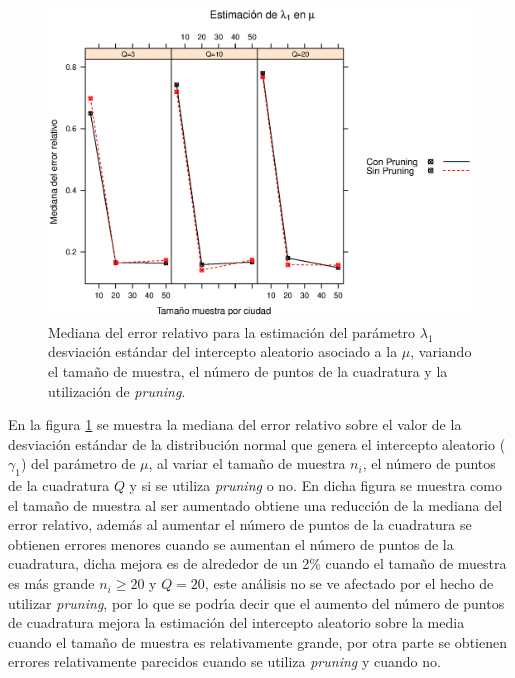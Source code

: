 \begin{figure}
	\begin{center}
		\includegraphics[scale=0.6]{MAPE_lambda1_mu.eps}	
		\caption{Mediana del error relativo para la estimaci\'{o}n del par\'{a}metro $\lambda_1$ desviaci\'{o}n est\'{a}ndar del intercepto aleatorio asociado a la $\mu$, variando el tama\~{n}o de muestra, el n\'{u}mero de puntos de la cuadratura y la utilizaci\'{o}n de \textit{pruning}.}
		\label{MAPE_lambda1_mu}
	\end{center}
\end{figure}

En la figura \ref{MAPE_lambda1_mu} se muestra la mediana del error relativo sobre el valor de la desviaci\'{o}n est\'{a}ndar de la distribuci\'{o}n normal que genera el intercepto aleatorio ($\gamma_1$) del par\'{a}metro de $\mu$, al variar el tama\~{n}o de muestra $n_i$, el n\'{u}mero de puntos de la cuadratura $Q$ y si se utiliza \textit{pruning} o no. En dicha figura se muestra como el tama\~{n}o de muestra al ser aumentado obtiene una reducci\'{o}n de la mediana del error relativo, adem\'{a}s al aumentar el n\'{u}mero de puntos de la cuadratura se obtienen errores menores cuando se aumentan el n\'{u}mero de puntos de la cuadratura, dicha mejora es de alrededor de un 2\% cuando el tama\~{n}o de muestra es m\'{a}s grande $n_i\geq20$ y $Q=20$, este an\'{a}lisis no se ve afectado por el hecho de utilizar \textit{pruning}, por lo que se podr\'{\i}a decir que el aumento del n\'{u}mero de puntos de cuadratura mejora la estimaci\'{o}n del intercepto aleatorio sobre la media cuando el tama\~{n}o de muestra es relativamente grande, por otra parte se obtienen errores relativamente parecidos cuando se utiliza \textit{pruning} y cuando no.\\


